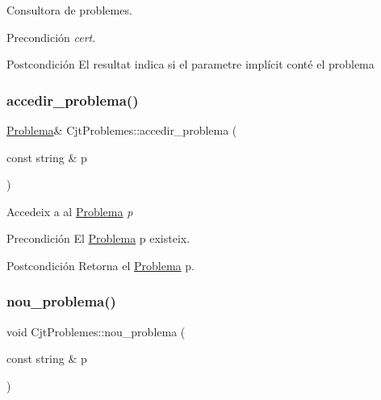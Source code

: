 Consultora de problemes. 

\begin{DoxyPrecond}{Precondición}
{\itshape cert}. 
\end{DoxyPrecond}
\begin{DoxyPostcond}{Postcondición}
El resultat indica si el parametre implícit conté el problema 
\end{DoxyPostcond}
\mbox{\label{class_cjt_problemes_ae0db90032709a9d6af8312b93877d514}} 
\subsubsection{\texorpdfstring{accedir\+\_\+problema()}{accedir\_problema()}}
{\footnotesize\ttfamily \mbox{\hyperlink{class_problema}{Problema}}\& Cjt\+Problemes\+::accedir\+\_\+problema (\begin{DoxyParamCaption}\item[{const string \&}]{p }\end{DoxyParamCaption})}



Accedeix a al \mbox{\hyperlink{class_problema}{Problema}} {\itshape p} 

\begin{DoxyPrecond}{Precondición}
El \mbox{\hyperlink{class_problema}{Problema}} p existeix. 
\end{DoxyPrecond}
\begin{DoxyPostcond}{Postcondición}
Retorna el \mbox{\hyperlink{class_problema}{Problema}} p. 
\end{DoxyPostcond}
\mbox{\label{class_cjt_problemes_a7a41c837128c629f7a4dcf81b1592581}} 
\subsubsection{\texorpdfstring{nou\+\_\+problema()}{nou\_problema()}}
{\footnotesize\ttfamily void Cjt\+Problemes\+::nou\+\_\+problema (\begin{DoxyParamCaption}\item[{const string \&}]{p }\end{DoxyParamCaption})}




